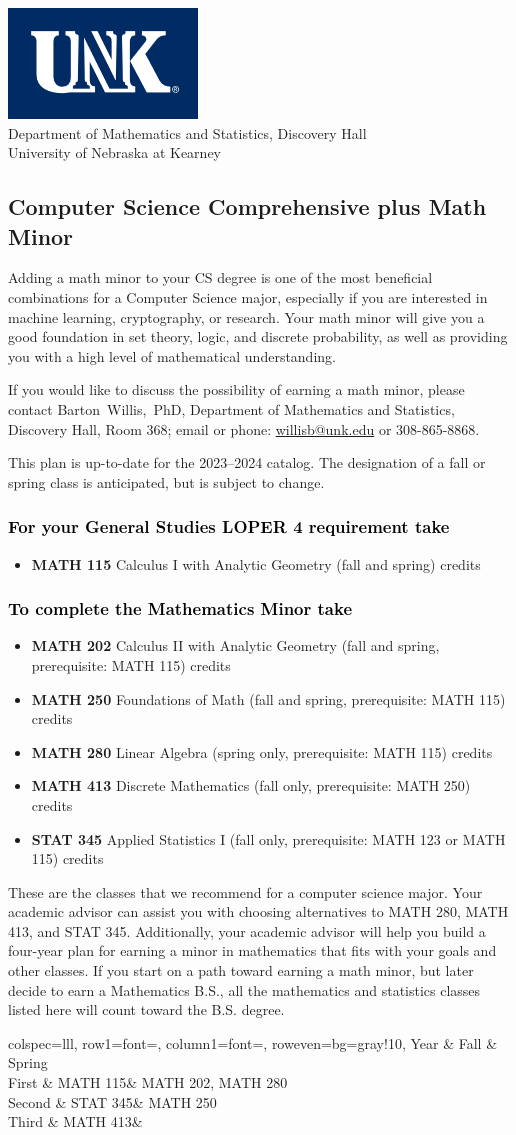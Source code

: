 \documentclass[10pt]{article}
\makeatletter
\newcommand{\calcone}{\textbf{MATH 115} Calculus I with Analytic Geometry (fall and spring) \dotfill 5 credits}
\newcommand{\calconeshort}{MATH 115}
\newcommand{\calctwo}{\textbf{MATH 202} Calculus II with Analytic Geometry (fall and spring, prerequisite: MATH 115) \dotfill 5 credits }
\newcommand{\calctwoshort}{MATH 202}
\newcommand{\foundations}{\textbf{MATH 250} Foundations of Math (fall and spring, prerequisite: MATH 115)  \dotfill 3 credits}
\newcommand{\foundationsshort}{MATH 250}
\newcommand{\linear}{\textbf{MATH 280} Linear Algebra (spring only, prerequisite: MATH 115) \dotfill 3 credits}
\newcommand{\linearshort}{MATH 280}
\newcommand{\discrete}{\textbf{MATH 413} Discrete Mathematics  (fall only, prerequisite: MATH 250)\dotfill 3 credits}
\newcommand{\discreteshort}{MATH 413}
\newcommand{\appliedstat}{\textbf{STAT 345} Applied Statistics I (fall only, prerequisite: MATH 123 or MATH 115) \dotfill 3 credits}
\newcommand{\appliedstatshort}{STAT 345}
\newcommand{\contactbw}{\mbox{Barton Willis, PhD}, Department of Mathematics and Statistics,  Discovery Hall, Room 368;
email or phone: \href{mailto:willisb@unk.edu}{willisb@unk.edu} or 308-865-8868.}
\newcommand{\forinfo}[2]{If you would like to discuss the possibility of earning a math {#1}, please contact \contactbw}
\newcommand{\catalog}{2023--2024 }
\newcommand{\LOPER}{LOPER\xspace}
\newcommand{\uptodate}{This plan is up-to-date for  the \catalog catalog. The designation of a fall or spring class is 
anticipated, but  is subject to change.}
\newcommand{\myheading}{
\begin{flushleft}
\includegraphics[scale=0.3]{unk-logo}\\
\setcounter{footnote}{0}
\vspace{0.25in}
 \textcolor{unkblue}{Department of Mathematics and Statistics, Discovery Hall} \\
  \textcolor{unkblue}{University of Nebraska at Kearney}
\end{flushleft}}
\newcommand{\mathminor}{      
\begin{table}[h]
  \caption*{Suggested Math Minor program of study}
   \center
  \begin{tblr}{
      colspec={lll},
      row{1}={font=\bfseries},
      column{1}={font=\itshape},
      row{even}={bg=gray!10},
    }
     Year        & Fall  & Spring   \\
    \toprule
    First & \calconeshort  & \calctwoshort, \linearshort  \\
    Second &  \appliedstatshort & \foundationsshort  \\
    Third & \discreteshort & \\
    \bottomrule
  \end{tblr}
\end{table}}
\makeatother
\begin{document}
\myheading


\subsection*{\textbf{\textcolor{unkblue}{Computer Science Comprehensive plus Math Minor}}}

Adding a math minor to your CS degree is one of the most beneficial 
combinations for a Computer Science major, especially if you are interested 
in machine learning, cryptography, or research. Your math minor will 
give you a good foundation in set theory, logic, and discrete probability, as 
well as providing you with a high level of mathematical understanding.


\forinfo{minor}{Computer Science Comprehensive degree}

\uptodate

\vspace{-0.1in}

\subsubsection*{\textcolor{black}{For your General Studies \LOPER 4 requirement take}}
\begin{itemize}
\item  \calcone
\end{itemize}

\subsubsection*{\textcolor{black}{To complete the Mathematics Minor take}}
\begin{itemize}
\item \calctwo
\item \foundations
\item \linear
\item \discrete
\item \appliedstat
\end{itemize}
\vspace{0.1in}
These are the classes that we recommend for a computer science major.
Your academic advisor can assist you with choosing alternatives 
to \linearshort, \discreteshort, and \appliedstatshort. Additionally,
your academic advisor will help you build a 
four-year plan for earning a minor in mathematics that fits with 
your goals and other classes.  If you start on a path toward earning a math minor, but later decide to 
earn a Mathematics B.S., all the mathematics and statistics  classes listed here 
will count toward the B.S. degree. 
\mathminor
\end{document}
